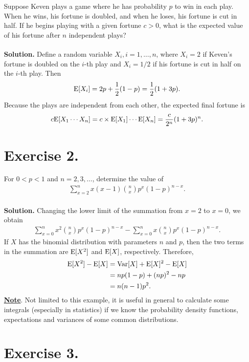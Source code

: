 Suppose Keven plays a game where he has probability $p$ to win in each play. When he wins, his fortune is doubled, and when he loses, his fortune is cut in half. If he begins playing with a given fortune $c > 0$, what is the expected value of his fortune after $n$ independent plays? \\
~\\
\textbf{Solution.} Define a random variable $X_i, i = 1, \ldots, n$, where $X_i = 2$ if Keven's fortune is doubled on the $i$-th play and $X_i = 1/2$ if his fortune is cut in half on the $i$-th play. Then
\begin{align*}
\mathrm{E}[X_i] = 2p + \frac{1}{2}(1-p) = \frac{1}{2}(1 + 3p).
\end{align*}
Because the plays are independent from each other, the expected final fortune is
\begin{align*}
c\mathrm{E}[X_1\cdots X_n] = c\times \mathrm{E}[X_1]\cdots \mathrm{E}[X_n] = \frac{c}{2^n}(1+3p)^n.
\end{align*}


\section*{Exercise 2.}

For $0 < p < 1$ and $n = 2, 3, \ldots$, determine the value of
\begin{align*}
\sum_{x=2}^n x(x-1)\binom{n}{x} p^x(1-p)^{n-x}.
\end{align*}
~\\
\textbf{Solution.} Changing the lower limit of the summation from $x = 2$ to $x = 0$, we obtain
\begin{align*}
\sum_{x=0}^n x^2\binom{n}{x} p^x(1-p)^{n-x} - \sum_{x=0}^n x\binom{n}{x} p^x(1-p)^{n-x}.
\end{align*}
If $X$ has the binomial distribution with parameters $n$ and $p$, then the two terms in the summation are $\mathrm{E}[X^2]$ and $\mathrm{E}[X]$, respectively. Therefore,
\begin{align*}
\mathrm{E}[X^2] - \mathrm{E}[X] & = \mathrm{Var}[X] + \mathrm{E}[X]^2 - \mathrm{E}[X] \\
& = np(1-p) + (np)^2 - np \\
& = n(n-1)p^2.
\end{align*}
\underline{\textbf{Note}}. Not limited to this example, it is useful in general to calculate some integrals (especially in statistics) if we know the probability density functions, expectations and variances of some common distributions.

\section*{Exercise 3.}

